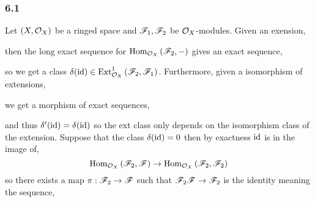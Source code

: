 \documentclass[12pt]{article}
\begin{document}
\subsubsection{6.1}

Let $(X, \mathcal{O}_{X})$ be a ringed space and $\mathscr{F}_1, \mathscr{F}_2$ be $\mathcal{O}_{X}$-modules. Given an exension,
\begin{center}
\end{center}
then the long exact sequence for $\mathrm{Hom}_{\mathcal{O}_{X}} \left( \mathscr{F}_2, - \right)$ gives an exact sequence,
\begin{center}
\end{center}
so we get a class $\delta(\mathrm{id}) \in \mathrm{Ext}^{1}_{\mathcal{O}_{X}} \left( \mathscr{F}_2, \mathscr{F}_1 \right)$. Furthermore, given a isomorphism of extensions,
\begin{center}
\end{center}
we get a morphism of exact sequences,
\begin{center}
\end{center}
and thus $\delta'(\mathrm{id}) = \delta(\mathrm{id})$ so the ext class only depends on the isomorphism class of the extension. Suppose that the class $\delta(\mathrm{id}) = 0$ then by exactness $\mathrm{id}$ is in the image of,
\[ \mathrm{Hom}_{\mathcal{O}_{X}} \left( \mathscr{F}_2, \mathscr{F} \right) \to \mathrm{Hom}_{\mathcal{O}_{X}} \left( \mathscr{F}_2, \mathscr{F}_2 \right) \]
so there exists a map $\pi : \mathscr{F}_2 \to \mathscr{F}$ such that $\mathscr{F}_2 \mathscr{F} \to \mathscr{F}_2$ is the identity meaning the sequence,
\begin{center}
\end{center}
\end{document}
